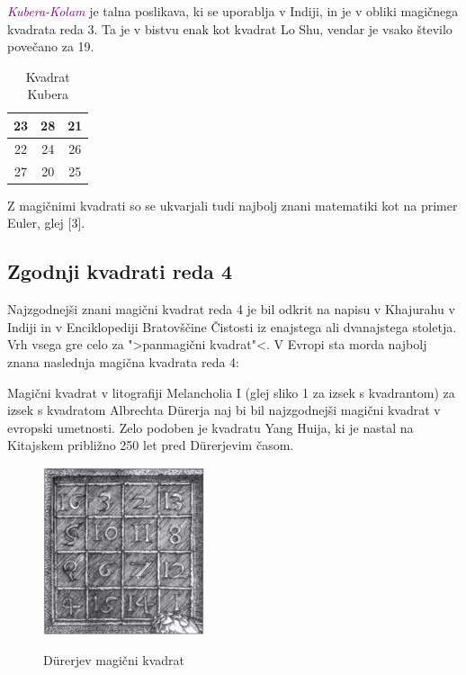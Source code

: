 \documentclass[a4paper,12pt]{article}
\begin{document}
\textcolor{purple}{\emph{Kubera-Kolam}} je talna poslikava, ki se uporablja v Indiji, in je v
obliki magičnega kvadrata reda 3. Ta je v bistvu enak kot kvadrat
Lo Shu, vendar je vsako število povečano za 19.
\begin{table}[ht]
   \centering
   \caption{Kvadrat Kubera} %
   \label{table:kubera} %
   \begin{tabular}{|c|c|c|}
   \hline
   23& 28 & 21 \\ \hline
   22& 24 & 26 \\ \hline
   27& 20 & 25 \\ \hline
   \end{tabular}
\end{table}


      

Z magičnimi kvadrati so se ukvarjali tudi najbolj znani matematiki kot na
primer Euler, glej [3]. %


\subsection{Zgodnji kvadrati reda 4}

Najzgodnejši znani magični kvadrat reda 4 je bil odkrit na napisu
v Khajurahu v Indiji in v Enciklopediji Bratovščine Čistosti iz enajstega
ali dvanajstega stoletja. Vrh vsega gre celo za ">panmagični kvadrat"<.
V Evropi sta morda najbolj znana naslednja magična kvadrata reda 4:

Magični kvadrat v litografiji Melancholia I (glej sliko 1 za izsek s kvadrantom)
za izsek s kvadratom Albrechta Dürerja naj bi bil najzgodnejši magični kvadrat
v evropski umetnosti. Zelo podoben je kvadratu Yang Huija, ki je nastal na Kitajskem
približno 250 let pred Dürerjevim časom. %
\begin{figure}
   \centering
   \caption {Dürerjev magični kvadrat}
   \includegraphics[scale=1.5]{durer.png}
   \label{fig:duner}
\end{figure}
   
\end{document}
